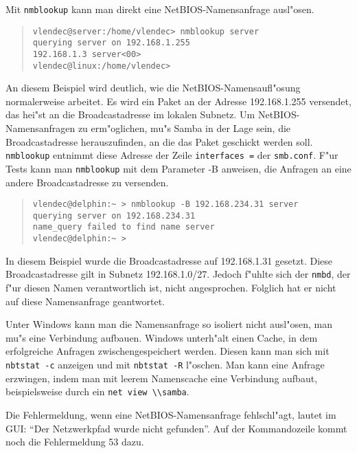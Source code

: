 \documentclass{scrartcl}\usepackage{pslatex}\typearea{12}
\newcommand{\prog}{\texttt}
\newcommand{\param}{\texttt}
\newcommand{\dateistyle}{\texttt}
\begin{document}
Mit \prog{nmblookup} kann man direkt eine NetBIOS-Namensanfrage
ausl"osen.

\begin{quote}
\begin{small}\begin{verbatim}
vlendec@server:/home/vlendec> nmblookup server
querying server on 192.168.1.255
192.168.1.3 server<00>
vlendec@linux:/home/vlendec>
\end{verbatim}\end{small}
\end{quote}
      
An diesem Beispiel wird deutlich, wie die NetBIOS-Namensaufl"osung
normalerweise arbeitet. Es wird ein Paket an der Adresse 192.168.1.255
versendet, das hei"st an die Broadcastadresse im lokalen Subnetz. Um
NetBIOS-Namensanfragen zu erm"oglichen, mu"s Samba in der Lage sein,
die Broadcastadresse herauszufinden, an die das Paket geschickt werden
soll.  \prog{nmblookup} entnimmt diese Adresse der Zeile
\param{interfaces =} der \dateistyle{smb.conf}. F"ur Tests kann man
\prog{nmblookup} mit dem Parameter -B anweisen, die Anfragen an eine
andere Broadcastadresse zu versenden.

\begin{quote}\begin{small}\begin{verbatim}
vlendec@delphin:~ > nmblookup -B 192.168.234.31 server
querying server on 192.168.234.31
name_query failed to find name server
vlendec@delphin:~ >
\end{verbatim}\end{small}\end{quote}

In diesem Beispiel wurde die Broadcastadresse auf 192.168.1.31
gesetzt. Diese Broadcastadresse gilt in Subnetz 192.168.1.0/27. Jedoch
f"uhlte sich der \prog{nmbd}, der f"ur diesen Namen verantwortlich
ist, nicht angesprochen. Folglich hat er nicht auf diese Namensanfrage
geantwortet.
      
Unter Windows kann man die Namensanfrage so isoliert nicht ausl"osen,
man mu"s eine Verbindung aufbauen. Windows unterh"alt einen Cache, in
dem erfolgreiche Anfragen zwischengespeichert werden. Diesen kann man
sich mit \prog{nbtstat -c} anzeigen und mit \prog{nbtstat -R} l"oschen.
Man kann eine Anfrage erzwingen, indem man mit leerem Namenscache eine
Verbindung aufbaut, beispielsweise durch ein \prog{net view
  \textbackslash{}\textbackslash{}samba}.

Die Fehlermeldung, wenn eine NetBIOS-Namensanfrage fehlschl"agt,
lautet im GUI: "`Der Netzwerkpfad wurde nicht gefunden"'. Auf der
Kommandozeile kommt noch die Fehlermeldung 53 dazu.
\end{document}
